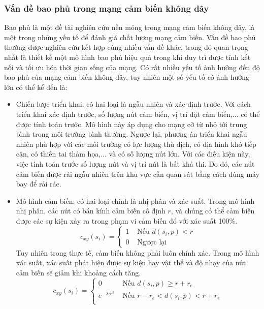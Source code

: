\documentclass{article}
\begin{document}
\subsubsection{Vấn đề bao phủ  trong mạng cảm biến không dây}
Bao phủ là một đề tài nghiên cứu nền móng trong mạng cảm biến không dây, là một trong những yếu tố để đánh giá chất lượng mạng cảm biến. Vấn đề bao phủ thường được nghiên cứu kết hợp cùng nhiều vấn đề khác, trong đó quan trọng nhất là thiết kế một mô hình  bao phủ hiệu quả trong khi duy trì được tính kết nối và tối ưu hóa thời gian sống của mạng.
\newline Có rất nhiều yếu tố ảnh hưởng đến độ bao phủ của mạng cảm biến không dây, tuy nhiên một số yếu tố có ảnh hưởng lớn có thể kể đến là:
\begin{itemize}
    \item Chiến lược triển khai: có hai loại là ngẫu nhiên và xác định trước. Với cách triển khai xác định trước, số lượng nút cảm biến, vị trí đặt cảm biến,... có thể được tính toán trước. Mô hình này áp dụng cho mạng cỡ từ nhỏ tới trung bình trong môi trường bình thường. Ngược lại, phương án triển khai ngẫu nhiên phù hợp với các môi trường có lực lượng thù địch, có địa hình khó tiếp cận, có thiên tai thảm họa,... và có số lượng nút lớn. Với các điều kiện này, việc tính toán trước số lượng nút và vị trí nút là bất khả thi. Do đó, các nút cảm biến được rải ngẫu nhiên trên khu vực cần quan sát bằng cách dùng máy bay để rải rác.
    \item Mô hình cảm biến: có hai loại chính là nhị phân và xác suất. Trong mô hình nhị phân, các nút có bán kính cảm biến cố định $r$, và chúng có thể cảm biến được các sự kiện xảy ra trong phạm vi cảm biến đó với xác suất 100\%.
    \begin{equation}
        c_{xy}(s_i) = 
        \begin{cases}
            1 & \text{ Nếu } d(s_i, p) < r \\
            0 & \text{ Ngược lại}
        \end{cases}
    \end{equation}
    Tuy nhiên trong thực tế, cảm biến không phải luôn chính xác. Trong mô hình xác suất, xác suất phát hiện được sự kiện hay vật thể và độ nhạy của nút cảm biến sẽ giảm khi khoảng cách tăng.
    \begin{equation}
        c_{xy}(s_i) = 
        \begin{cases}
            0 & \text{ Nếu } d(s_i, p) \geq r+r_e \\
            e^{-\lambda\alpha^\beta} & \text{ Nếu } r-r_e < d(s_i, p) < r+r_e \\

\end{cases}
\end{equation}
\end{itemize}
\end{document}
